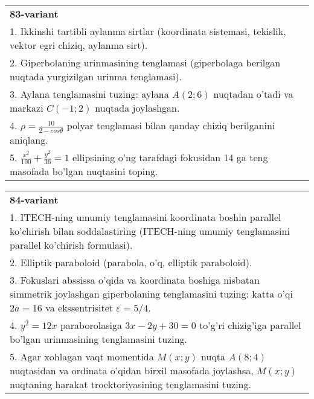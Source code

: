 \documentclass{article}
\begin{document}
\begin{tabular}{m{17cm}}
\textbf{83-variant}\\
1. Ikkinshi tartibli aylanma sirtlar (koordinata sistemasi, tekislik, vektor egri chiziq, aylanma sirt).\\

2. Giperbolaning urinmasining tenglamasi (giperbolaga berilgan nuqtada yurgizilgan urinma tenglamasi).\\

3. Aylana tenglamasini tuzing: aylana $A(2;6)$ nuqtadan o'tadi va markazi $C(-1;2)$ nuqtada joylashgan.\\

4. $\rho = \frac{10}{2 - cos\theta}$ polyar tenglamasi bilan qanday chiziq berilganini aniqlang.  \\

5. $\frac{x^{2}}{100} + \frac{y^{2}}{36} = 1$ ellipsining o'ng tarafdagi fokusidan 14 ga teng masofada bo'lgan nuqtasini toping.  
\end{tabular}
\vspace{1cm}


\begin{tabular}{m{17cm}}
\textbf{84-variant}\\
1. ITECH-ning umumiy tenglamasini koordinata boshin parallel ko'chirish bilan soddalastiring (ITECH-ning umumiy tenglamasini parallel ko'chirish formulasi).\\

2. Elliptik paraboloid (parabola, o'q, elliptik paraboloid).\\

3. Fokuslari abssissa o'qida va koordinata boshiga nisbatan simmetrik joylashgan giperbolaning tenglamasini tuzing: katta o'qi $2a=16$ va ekssentrisitet $\varepsilon=5/4$.\\

4. $y^{2} = 12x$ paraborolasiga $3x - 2y + 30 = 0$ to'g'ri chizig'iga parallel bo'lgan urinmasining tenglamasini tuzing.  \\

5. Agar xohlagan vaqt momentida $M(x;y)$ nuqta $A(8;4)$ nuqtasidan va ordinata o'qidan birxil masofada joylashsa, $M(x;y)$ nuqtaning harakat troektoriyasining tenglamasini tuzing.  
\end{tabular}
\vspace{1cm}
\end{document}
